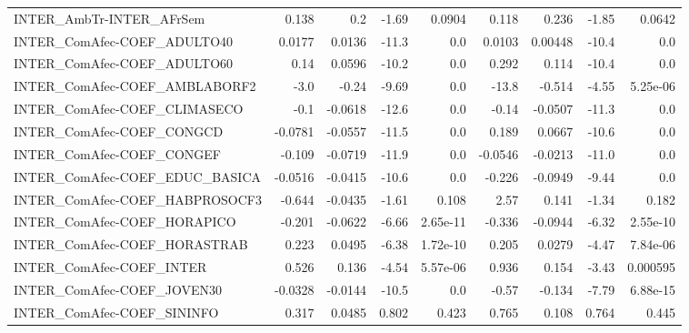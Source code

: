 \begin{tabular}{lrrrrrrrr}
INTER\_AmbTr-INTER\_AFrSem               &       0.138 &          0.2 &   -1.69 &   0.0904 &      0.118 &       0.236 &        -1.85 &        0.0642 \\
INTER\_ComAfec-COEF\_ADULTO40            &      0.0177 &       0.0136 &   -11.3 &      0.0 &     0.0103 &     0.00448 &        -10.4 &           0.0 \\
INTER\_ComAfec-COEF\_ADULTO60            &        0.14 &       0.0596 &   -10.2 &      0.0 &      0.292 &       0.114 &        -10.4 &           0.0 \\
INTER\_ComAfec-COEF\_AMBLABORF2          &        -3.0 &        -0.24 &   -9.69 &      0.0 &      -13.8 &      -0.514 &        -4.55 &      5.25e-06 \\
INTER\_ComAfec-COEF\_CLIMASECO           &        -0.1 &      -0.0618 &   -12.6 &      0.0 &      -0.14 &     -0.0507 &        -11.3 &           0.0 \\
INTER\_ComAfec-COEF\_CONGCD              &     -0.0781 &      -0.0557 &   -11.5 &      0.0 &      0.189 &      0.0667 &        -10.6 &           0.0 \\
INTER\_ComAfec-COEF\_CONGEF              &      -0.109 &      -0.0719 &   -11.9 &      0.0 &    -0.0546 &     -0.0213 &        -11.0 &           0.0 \\
INTER\_ComAfec-COEF\_EDUC\_BASICA         &     -0.0516 &      -0.0415 &   -10.6 &      0.0 &     -0.226 &     -0.0949 &        -9.44 &           0.0 \\
INTER\_ComAfec-COEF\_HABPROSOCF3         &      -0.644 &      -0.0435 &   -1.61 &    0.108 &       2.57 &       0.141 &        -1.34 &         0.182 \\
INTER\_ComAfec-COEF\_HORAPICO            &      -0.201 &      -0.0622 &   -6.66 & 2.65e-11 &     -0.336 &     -0.0944 &        -6.32 &      2.55e-10 \\
INTER\_ComAfec-COEF\_HORASTRAB           &       0.223 &       0.0495 &   -6.38 & 1.72e-10 &      0.205 &      0.0279 &        -4.47 &      7.84e-06 \\
INTER\_ComAfec-COEF\_INTER               &       0.526 &        0.136 &   -4.54 & 5.57e-06 &      0.936 &       0.154 &        -3.43 &      0.000595 \\
INTER\_ComAfec-COEF\_JOVEN30             &     -0.0328 &      -0.0144 &   -10.5 &      0.0 &      -0.57 &      -0.134 &        -7.79 &      6.88e-15 \\
INTER\_ComAfec-COEF\_SININFO             &       0.317 &       0.0485 &   0.802 &    0.423 &      0.765 &       0.108 &        0.764 &         0.445 \\

\end{tabular}
